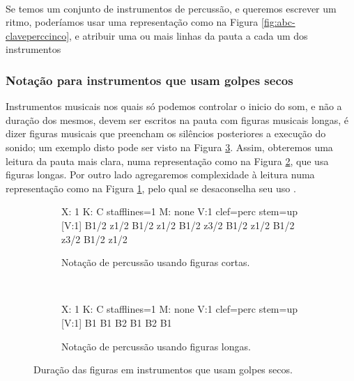 \begin{example} ~

\begin{minipage}{0.845\textwidth}
Se temos um conjunto de instrumentos de percussão, 
e queremos escrever um ritmo, poderíamos usar uma representação como na Figura \ref{fig:abc-claveperccinco},
e atribuir uma ou mais linhas da pauta a cada um dos instrumentos
\end{minipage}
\end{example} 



\subsubsection{Notação para instrumentos que usam golpes secos}
Instrumentos musicais nos quais só podemos controlar o inicio do som, e não a duração dos mesmos, 
devem ser escritos na pauta com figuras musicais longas, 
é dizer figuras musicais que preencham os silêncios posteriores a execução do sonido;
um exemplo disto pode ser visto na Figura \ref{fig:clavepercusiondryall}.
Assim, obteremos uma leitura da pauta mais clara, 
numa representação como na Figura \ref{fig:abc-clavepercusiondry2}, que usa figuras longas.
Por outro lado agregaremos complexidade à leitura numa representação como na Figura \ref{fig:abc-clavepercusiondry1},
pelo qual se desaconselha seu uso \cite[pp. 289]{gould676behind}.
\begin{figure}[h]
    \centering 
\begin{subfigure}[c]{0.45\textwidth}
\begin{abc}[name=abc-clavepercusiondry1]
%
X: 1 %
K: C stafflines=1 %
M: none %
V:1 clef=perc stem=up %
%
[V:1] B1/2 z1/2 B1/2 z1/2 B1/2 z3/2 B1/2 z1/2 B1/2 z3/2 B1/2 z1/2 
\end{abc}
\caption{Notação de percussão usando figuras cortas.}
\label{fig:abc-clavepercusiondry1}
\end{subfigure}
~%
\begin{subfigure}[c]{0.45\textwidth}
\begin{abc}[name=abc-clavepercusiondry2]
%
X: 1 %
K: C stafflines=1 %
M: none %
V:1 clef=perc stem=up %
%
[V:1] B1 B1 B2 B1 B2 B1 
\end{abc}
\caption{Notação de percussão usando figuras longas.}
\label{fig:abc-clavepercusiondry2}
\end{subfigure}
    \caption{Duração das figuras em instrumentos que usam golpes secos.}\label{fig:clavepercusiondryall}
\end{figure}

